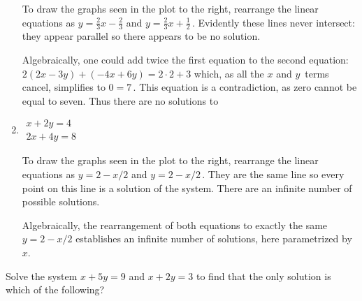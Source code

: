 \begin{example}
\begin{enumerate}[ref=\ref{eg:2eqs2vars}(\alph*)]
\begin{figbox}[\vspace{1ex}]
\begin{solution} 
To draw the graphs seen in the plot to the right, rearrange  the linear equations as \(y=\frac23x-\frac23\) and \(y=\frac23x+\frac12\)\,.  
Evidently these lines never intersect: they appear parallel so there appears to be no solution.
\notyetaqedfalse%

\end{solution}
\end{figbox}

Algebraically, one could add twice the first equation to the second equation: \(2(2x-3y)+(-4x+6y)=2\cdot2+3\) which, as all the \(x\) and \(y\)~terms cancel, simplifies to \(0=7\)\,. 
This equation is a contradiction, as zero cannot be equal to seven.  
Thus there are no solutions to 
\aqed


\item 
\begin{figbox}{}%
\(\begin{array}{l} x+2y=4\\2x+4y=8 \end{array}\)

\begin{solution} 
To draw the graphs seen in the plot to the right, rearrange  the linear equations as \(y=2-x/2\) and \(y=2-x/2\)\,.  
They are the same line so every point on this line is a solution of the system.  
There are an infinite number of possible solutions.
\notyetaqedfalse%

\end{solution}
\end{figbox}

Algebraically, the rearrangement of both equations to exactly the same \(y=2-x/2\) establishes an infinite number of solutions, here parametrized by~\(x\).
\aqed


\end{enumerate}
\end{example}



\begin{activity}
Solve the system \(x+5y=9\) and \(x+2y=3\) to find that the only solution is which of the following?
\end{activity}




